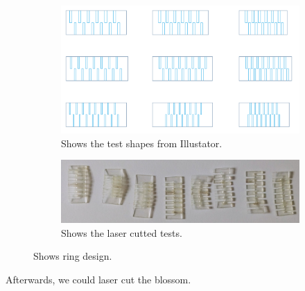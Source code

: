 \documentclass[12pt,twoside,a4paper]{article}
\begin{document}
        \begin{figure}[ht!]
            \centering
            \begin{subfigure}{.5\textwidth}
              \centering
              \includegraphics[width=.8\linewidth]{images/process/test_shapes.PNG}
              \caption{Shows the test shapes from Illustator.}
              \label{fig:test_shapes}
            \end{subfigure}%
            \begin{subfigure}{.5\textwidth}
              \centering
              \includegraphics[width=.8\linewidth]{images/process/laserCutTests.jpg}
              \caption{Shows the laser cutted tests.}
              \label{fig:ringdesign2}
            \end{subfigure}
            \caption{Shows ring design.}
            \label{fig:laserCutTests}
        \end{figure}

        Afterwards, we could laser cut the blossom.
        
\end{document}
